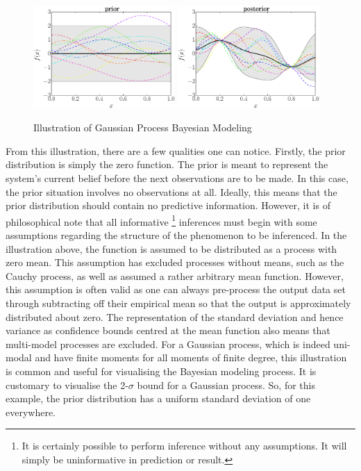 			\begin{figure}[!htbp]
				\centering
					\includegraphics[width=0.48\textwidth]{Figures/bayesian_modeling/prior_draws.eps}
					\includegraphics[width=0.48\textwidth]{Figures/bayesian_modeling/posterior_draws2.eps}
				\caption{Illustration of Gaussian Process Bayesian Modeling}
				\label{Figure:BayesianModeling}
			\end{figure}
			
			From this illustration, there are a few qualities one can notice. Firstly, the prior distribution is simply the zero function. The prior is meant to represent the system's current belief before the next observations are to be made. In this case, the prior situation involves no observations at all. Ideally, this means that the prior distribution should contain no predictive information. However, it is of philosophical note that all informative \footnote{It is certainly possible to perform inference without any assumptions. It will simply be uninformative in prediction or result.} inferences must begin with some assumptions regarding the structure of the phenomenon to be inferenced. In the illustration above, the function is assumed to be distributed as a process with zero mean. This assumption has excluded processes without means, such as the Cauchy process, as well as assumed a rather arbitrary mean function. However, this assumption is often valid as one can always pre-process the output data set through subtracting off their empirical mean so that the output is approximately distributed about zero. The representation of the standard deviation and hence variance as confidence bounds centred at the mean function also means that multi-model processes are excluded. For a Gaussian process, which is indeed uni-modal and have finite moments for all moments of finite degree, this illustration is common and useful for visualising the Bayesian modeling process. It is customary to visualise the 2-$\sigma$ bound for a Gaussian process. So, for this example, the prior distribution has a uniform standard deviation of one everywhere.
			
